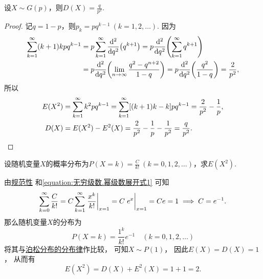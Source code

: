 \begin{theorem}\label{theorem:随机变量的数字特征.几何分布的方差}
设\(X \sim G(p)\)，则\(D(X) = \frac{q}{p^2}\).
\begin{proof}
记\(q = 1-p\)，则\(p_k = pq^{k-1}\ (k=1,2,\dotsc)\).
因为\begin{align*}
	\sum_{k=1}^\infty (k+1)kpq^{k-1}
	&= p \sum_{k=1}^\infty \dv[2]{q}(q^{k+1})
	= p \dv[2]{q}(\sum_{k=1}^\infty q^{k+1}) \\
	&= p \dv[2]{q}(\lim_{n\to\infty} \frac{q^2-q^{n+2}}{1-q})
	= p \dv[2]{q}(\frac{q^2}{1-q})
	= \frac{2}{p^2}, \\
\end{align*}
所以\begin{align*}
	E(X^2) &= \sum_{k=1}^\infty k^2 pq^{k-1}
	= \sum_{k=1}^\infty [(k+1)k-k] pq^{k-1}
	= \frac{2}{p^2} - \frac{1}{p}, \\
	D(X) &= E(X^2) - E^2(X)
	= \frac{2}{p^2} - \frac{1}{p} - \frac{1}{p^2}
	= \frac{q}{p^2}.
	\qedhere
\end{align*}
\end{proof}
\end{theorem}

\begin{example}
设随机变量\(X\)的概率分布为\(P(X=k) = \frac{C}{k!}\ (k=0,1,2,\dotsc)\)，求\(E(X^2)\).
\begin{solution}
由\hyperref[theorem:随机变量及其分布.离散型随机变量的密度函数的性质]{规范性}%
和\cref{equation:无穷级数.幂级数展开式1} 可知\[
	\sum_{k=0}^\infty \frac{C}{k!}
	= C \sum_{k=1}^\infty \eval{\frac{x^k}{k!}}_{x=1}
	= C \eval{e^x}_{x=1}
	= C e = 1
	\implies
	C = e^{-1}.
\]
那么随机变量\(X\)的分布为\[
	P(X=k) = \frac{1^k}{k!} e^{-1} \quad(k=0,1,2,\dotsc)
\]
将其与\hyperref[equation:随机变量及其分布.泊松分布的分布律]{泊松分布的分布律}作比较，
可知\(X \sim P(1)\)，
因此\(E(X) = D(X) = 1\)，
从而有\[
	E(X^2) = D(X) + E^2(X) = 1 + 1 = 2.
\]
\end{solution}
\end{example}

